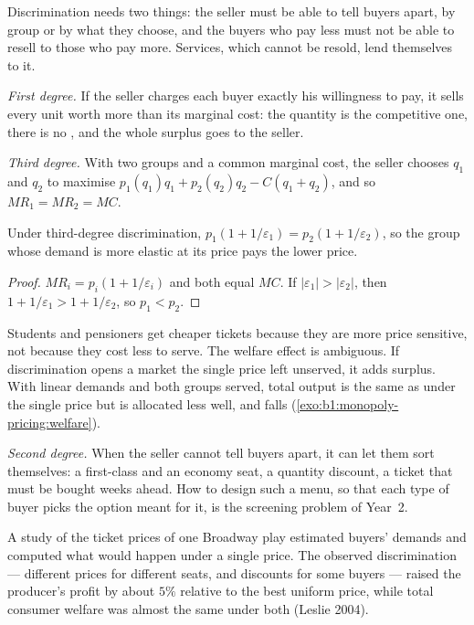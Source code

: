 Discrimination needs two things: the seller must be able to tell buyers
apart, by group or by what they choose, and the buyers who pay less must
not be able to resell to those who pay more. Services, which cannot be
resold, lend themselves to it.

\emph{First degree.} If the seller charges each buyer exactly his
willingness to pay, it sells every unit worth more than its marginal cost:
the quantity is the competitive one, there is no , and the
whole surplus goes to the seller.

\emph{Third degree.} With two groups and a common marginal cost, the seller
chooses $q_1$ and $q_2$ to maximise $p_1(q_1)q_1 + p_2(q_2)q_2 - C(q_1 + q_2)$, and so
$MR_1 = MR_2 = MC$.

\begin{proposition}\label{prop:b1:monopoly-pricing:third}
Under third-degree discrimination, $p_1(1 + 1/\varepsilon_1) = p_2(1 + 1/\varepsilon_2)$, so the group whose
demand is more elastic at its price pays the lower price.
\end{proposition}

\begin{proof}
$MR_i = p_i(1 + 1/\varepsilon_i)$ and both equal $MC$. If $|\varepsilon_1| > |\varepsilon_2|$, then
$1 + 1/\varepsilon_1 > 1 + 1/\varepsilon_2$, so $p_1 < p_2$.
\end{proof}

Students and pensioners get cheaper tickets because they are more price
sensitive, not because they cost less to serve. The welfare effect is
ambiguous. If discrimination opens a market the single price left unserved,
it adds surplus. With linear demands and both groups served, total output
is the same as under the single price but is allocated less well, and
 falls (\cref{exo:b1:monopoly-pricing:welfare}).

\emph{Second degree.} When the seller cannot tell buyers apart, it can let
them sort themselves: a first-class and an economy seat, a quantity
discount, a ticket that must be bought weeks ahead. How to design such a
menu, so that each type of buyer picks the option meant for it, is the
screening problem of Year~2.

\begin{record}
A study of the ticket prices of one Broadway play estimated buyers'
demands and computed what would happen under a single price. The
observed discrimination --- different prices for different seats, and
discounts for some buyers --- raised the producer's profit by about $5\%$
relative to the best uniform price, while total consumer welfare was almost
the same under both (Leslie 2004). %
\end{record}

